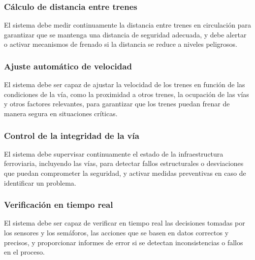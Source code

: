\documentclass[journal]{IEEEtran}
\begin{document}
\subsubsection{Cálculo de distancia entre trenes} 
El sistema debe medir continuamente la distancia entre trenes en circulación para garantizar que se mantenga una distancia de seguridad adecuada, y debe alertar o activar mecanismos de frenado si la distancia se reduce a niveles peligrosos.

\subsubsection{Ajuste automático de velocidad} 
El sistema debe ser capaz de ajustar la velocidad de los trenes en función de las condiciones de la vía, como la proximidad a otros trenes, la ocupación de las vías y otros factores relevantes, para garantizar que los trenes puedan frenar de manera segura en situaciones críticas.

\subsubsection{Control de la integridad de la vía} 
El sistema debe supervisar continuamente el estado de la infraestructura ferroviaria, incluyendo las vías, para detectar fallos estructurales o desviaciones que puedan comprometer la seguridad, y activar medidas preventivas en caso de identificar un problema.

\subsubsection{Verificación en tiempo real} 
El sistema debe ser capaz de verificar en tiempo real las decisiones tomadas por los sensores y los semáforos, las acciones que se basen en datos correctos y precisos, y proporcionar informes de error si se detectan inconsistencias o fallos en el proceso.



\sloppy
\end{document}
